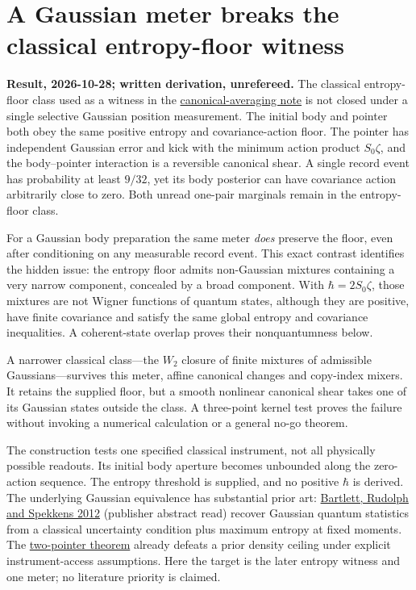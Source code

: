 \documentclass[11pt,a4paper]{article}
\begin{document}
\hypertarget{a-gaussian-meter-breaks-the-classical-entropy-floor-witness}{%
\section{A Gaussian meter breaks the classical entropy-floor
witness}\label{a-gaussian-meter-breaks-the-classical-entropy-floor-witness}}

\textbf{Result, 2026-10-28; written derivation, unrefereed.} The
classical entropy-floor class used as a witness in the
\href{central-limit-canonical-gaussian-sector.md}{canonical-averaging
note} is not closed under a single selective Gaussian position
measurement. The initial body and pointer both obey the same positive
entropy and covariance-action floor. The pointer has independent
Gaussian error and kick with the minimum action product \(S_0\zeta\),
and the body--pointer interaction is a reversible canonical shear. A
single record event has probability at least \(9/32\), yet its body
posterior can have covariance action arbitrarily close to zero. Both
unread one-pair marginals remain in the entropy-floor class.

For a Gaussian body preparation the same meter \emph{does} preserve the
floor, even after conditioning on any measurable record event. This
exact contrast identifies the hidden issue: the entropy floor admits
non-Gaussian mixtures containing a very narrow component, concealed by a
broad component. With \(\hbar=2S_0\zeta\), those mixtures are not Wigner
functions of quantum states, although they are positive, have finite
covariance and satisfy the same global entropy and covariance
inequalities. A coherent-state overlap proves their nonquantumness
below.

A narrower classical class---the \(W_2\) closure of finite mixtures of
admissible Gaussians---survives this meter, affine canonical changes and
copy-index mixers. It retains the supplied floor, but a smooth nonlinear
canonical shear takes one of its Gaussian states outside the class. A
three-point kernel test proves the failure without invoking a numerical
calculation or a general no-go theorem.

The construction tests one specified classical instrument, not all
physically possible readouts. Its initial body aperture becomes
unbounded along the zero-action sequence. The entropy threshold is
supplied, and no positive \(\hbar\) is derived. The underlying Gaussian
equivalence has substantial prior art:
\href{https://doi.org/10.1103/PhysRevA.86.012103}{Bartlett, Rudolph and
Spekkens 2012} (publisher abstract read) recover Gaussian quantum
statistics from a classical uncertainty condition plus maximum entropy
at fixed moments. The
\href{necessity-unit-and-indeterminacy.md\#3-theorem-i-the-two-pointer-construction}{two-pointer
theorem} already defeats a prior density ceiling under explicit
instrument-access assumptions. Here the target is the later entropy
witness and one meter; no literature priority is claimed.
\end{document}
